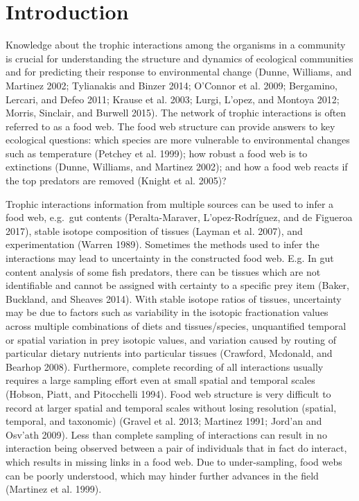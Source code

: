 \documentclass{article}
\begin{document}
\hypertarget{introduction}{%
\section{Introduction}\label{introduction}}

Knowledge about the trophic interactions among the organisms in a
community is crucial for understanding the structure and dynamics of
ecological communities and for predicting their response to
environmental change (Dunne, Williams, and Martinez 2002; Tylianakis and
Binzer 2014; O'Connor et al. 2009; Bergamino, Lercari, and Defeo 2011;
Krause et al. 2003; Lurgi, L\a'opez, and Montoya 2012; Morris, Sinclair,
and Burwell 2015). The network of trophic interactions is often referred
to as a food web. The food web structure can provide answers to key
ecological questions: which species are more vulnerable to environmental
changes such as temperature (Petchey et al. 1999); how robust a food web
is to extinctions (Dunne, Williams, and Martinez 2002); and how a food
web reacts if the top predators are removed (Knight et al. 2005)?

Trophic interactions information from multiple sources can be used to
infer a food web, e.g.~gut contents (Peralta-Maraver,
L\a'opez-Rodríguez, and de Figueroa 2017), stable isotope composition of
tissues (Layman et al. 2007), and experimentation (Warren 1989).
Sometimes the methods used to infer the interactions may lead to
uncertainty in the constructed food web. E.g. In gut content analysis of
some fish predators, there can be tissues which are not identifiable and
cannot be assigned with certainty to a specific prey item (Baker,
Buckland, and Sheaves 2014). With stable isotope ratios of tissues,
uncertainty may be due to factors such as variability in the isotopic
fractionation values across multiple combinations of diets and
tissues/species, unquantified temporal or spatial variation in prey
isotopic values, and variation caused by routing of particular dietary
nutrients into particular tissues (Crawford, Mcdonald, and Bearhop
2008). Furthermore, complete recording of all interactions usually
requires a large sampling effort even at small spatial and temporal
scales (Hobson, Piatt, and Pitocchelli 1994). Food web structure is very
difficult to record at larger spatial and temporal scales without losing
resolution (spatial, temporal, and taxonomic) (Gravel et al. 2013;
Martinez 1991; Jord\a'an and Osv\a'ath 2009). Less than complete
sampling of interactions can result in no interaction being observed
between a pair of individuals that in fact do interact, which results in
missing links in a food web. Due to under-sampling, food webs can be
poorly understood, which may hinder further advances in the field
(Martinez et al. 1999).
\end{document}
